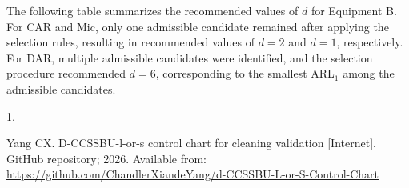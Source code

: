 \documentclass[
  12pt,
  letterpaper,
  DIV=11,
  numbers=noendperiod]{scrartcl}
\newlength{\cslhangindent}
\newlength{\csllabelwidth}
\newenvironment{CSLReferences}[2] %
 {\begin{list}{}{%
  \setlength{\itemindent}{0pt}
  \setlength{\leftmargin}{0pt}
  \setlength{\parsep}{0pt}
  \ifodd #1
   \setlength{\leftmargin}{\cslhangindent}
   \setlength{\itemindent}{-1\cslhangindent}
  \fi
  \setlength{\itemsep}{#2\baselineskip}}}
 {\end{list}}
\newcommand{\CSLLeftMargin}[1]{\parbox[t]{\csllabelwidth}{\strut#1\strut}}
\newcommand{\CSLRightInline}[1]{\parbox[t]{\linewidth - \csllabelwidth}{\strut#1\strut}}
\begin{document}
\FloatBarrier

The following table summarizes the recommended values of \(d\) for
Equipment B. For CAR and Mic, only one admissible candidate remained
after applying the selection rules, resulting in recommended values of
\(d=2\) and \(d=1\), respectively. For DAR, multiple admissible
candidates were identified, and the selection procedure recommended
\(d=6\), corresponding to the smallest ARL\(_1\) among the admissible
candidates.

\begin{table}[H]
\centering
\caption{\label{tab:display-d-selection-recommendation-l-equipment-b-v7}Recommended d values for the d-CCSSBU-L chart for Equipment B.}
\centering
{}
\end{table}

\FloatBarrier

\protect{}\label{refs}
\begin{CSLReferences}{0}{1}
\CSLLeftMargin{1. }%
\CSLRightInline{Yang CX. D-CCSSBU-l-or-s control chart for cleaning
validation {[}Internet{]}. GitHub repository; 2026. Available from:
\url{https://github.com/ChandlerXiandeYang/d-CCSSBU-L-or-S-Control-Chart}}

\end{CSLReferences}
\end{document}
